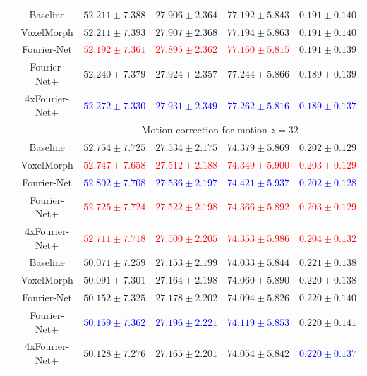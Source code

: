 \documentclass[english,version-2022-01]{uzl-thesis} %
\begin{document}
\begin{table}[h]
\begin{tabular}{c c c c c c}
		\midrule		
		\multirow{5}{*}{\rotatebox{90}{$R=10$}} & Baseline & $52.211 \pm 7.388$ & $27.906 \pm 2.364$ & $77.192 \pm 5.843$ & $0.191 \pm 0.140$ \\  
		 & VoxelMorph & $52.211 \pm 7.393$ & $27.907 \pm 2.368$ & $77.194 \pm 5.863$ & $0.191 \pm 0.140$ \\  
		 & Fourier-Net & \textcolor{red}{$52.192 \pm 7.361$} & \textcolor{red}{$27.895 \pm 2.362$} & \textcolor{red}{$77.160 \pm 5.815$} & $0.191 \pm 0.139$ \\  
		 & Fourier-Net+ & $52.240 \pm 7.379$ & $27.924 \pm 2.357$ & $77.244 \pm 5.866$ & $0.189 \pm 0.139$ \\   
		 & 4xFourier-Net+ & \textcolor{blue}{$52.272 \pm 7.330$} & \textcolor{blue}{$27.931 \pm 2.349$} & \textcolor{blue}{$77.262 \pm 5.816$} & \textcolor{blue}{$0.189 \pm 0.137$} \\ 
		 
		 \midrule	
		 & & \multicolumn{4}{c}{Motion-correction for motion $z=32$} \\
		\midrule
		\multirow{5}{*}{\rotatebox{90}{$R=4$}} & Baseline & $52.754 \pm 7.725$ & $27.534 \pm 2.175$ & $74.379 \pm 5.869$ & $0.202 \pm 0.129$ \\  
		 & VoxelMorph & \textcolor{red}{$52.747 \pm 7.658$} & \textcolor{red}{$27.512 \pm 2.188$} & \textcolor{red}{$74.349 \pm 5.900$} & \textcolor{red}{$0.203 \pm 0.129$} \\  
		 & Fourier-Net & \textcolor{blue}{$52.802 \pm 7.708$} & \textcolor{blue}{$27.536 \pm 2.197$} & \textcolor{blue}{$74.421 \pm 5.937$} & \textcolor{blue}{$0.202 \pm 0.128$} \\  
		 & Fourier-Net+ & \textcolor{red}{$52.725 \pm 7.724$} & \textcolor{red}{$27.522 \pm 2.198$} & \textcolor{red}{$74.366 \pm 5.892$} & \textcolor{red}{$0.203 \pm 0.129$} \\   
		 & 4xFourier-Net+ & \textcolor{red}{$52.711 \pm 7.718$} & \textcolor{red}{$27.500 \pm 2.205$} & \textcolor{red}{$74.353 \pm 5.986$} & \textcolor{red}{$0.204 \pm 0.132$} \\  
		
		\midrule
		\multirow{5}{*}{\rotatebox{90}{$R=8$}} & Baseline & $50.071 \pm 7.259$ & $27.153 \pm 2.199$ & $74.033 \pm 5.844$ & $0.221 \pm 0.138$ \\  
		 & VoxelMorph & $50.091 \pm 7.301$ & $27.164 \pm 2.198$ & $74.060 \pm 5.890$ & $0.220 \pm 0.138$ \\  
		 & Fourier-Net & $50.152 \pm 7.325$ & $27.178 \pm 2.202$ & $74.094 \pm 5.826$ & $0.220 \pm 0.140$ \\  
		 & Fourier-Net+ & \textcolor{blue}{$50.159 \pm 7.362$} & \textcolor{blue}{$27.196 \pm 2.221$} & \textcolor{blue}{$74.119 \pm 5.853$} & $0.220 \pm 0.141$ \\   
		 & 4xFourier-Net+ & $50.128 \pm 7.276$ & $27.165 \pm 2.201$ & $74.054 \pm 5.842$ & \textcolor{blue}{$0.220 \pm 0.137$} \\ 
		 	 

\end{tabular}
\end{table}
\end{document}
